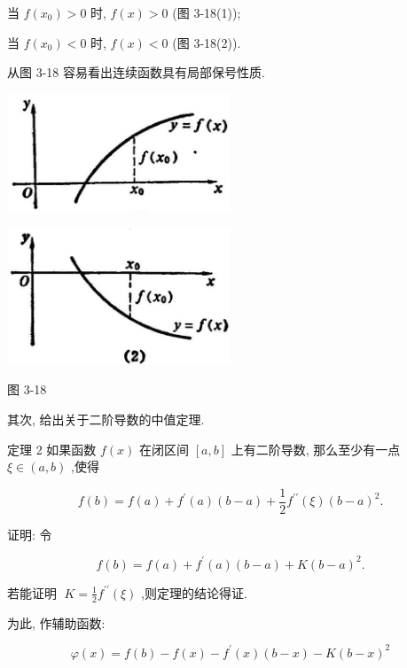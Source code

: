 \documentclass[lang=cn,newtx,10pt,scheme=chinese]{elegantbook}
\begin{document}
当 \(f\left( {x}_{0}\right) > 0\) 时, \(f\left( x\right) > 0\) (图 3-18(1));

当 \(f\left( {x}_{0}\right) < 0\) 时, \(f\left( x\right) < 0\) (图 3-18(2)).

从图 3-18 容易看出连续函数具有局部保号性质.

\begin{center}
\includegraphics[max width=0.5\textwidth]{images/01912c18-5c3f-733d-b775-749ba9897a9d_160_145040.jpg}
\end{center}

\begin{center}
\includegraphics[max width=0.5\textwidth]{images/01912c18-5c3f-733d-b775-749ba9897a9d_160_221128.jpg}
\end{center}

图 3-18

其次, 给出关于二阶导数的中值定理.

定理 2 如果函数 \(f\left( x\right)\) 在闭区间 \(\left\lbrack {a,b}\right\rbrack\) 上有二阶导数, 那么至少有一点 \(\xi \in \left( {a,b}\right)\) ,使得

\[
f\left( b\right) = f\left( a\right) + {f}^{\prime }\left( a\right) \left( {b - a}\right) + \frac{1}{2}{f}^{\prime \prime }\left( \xi \right) {\left( b - a\right) }^{2}. \tag{1}
\]

证明: 令

\[
f\left( b\right) = f\left( a\right) + {f}^{\prime }\left( a\right) \left( {b - a}\right) + K{\left( b - a\right) }^{2}. \tag{2}
\]

若能证明 \(\;K = \frac{1}{2}{f}^{\prime \prime }\left( \xi \right)\) ,则定理的结论得证.

为此, 作辅助函数:

\[
\varphi \left( x\right) = f\left( b\right) - f\left( x\right) - {f}^{\prime }\left( x\right) \left( {b - x}\right) - K{\left( b - x\right) }^{2} \tag{3}
\]
\end{document}
